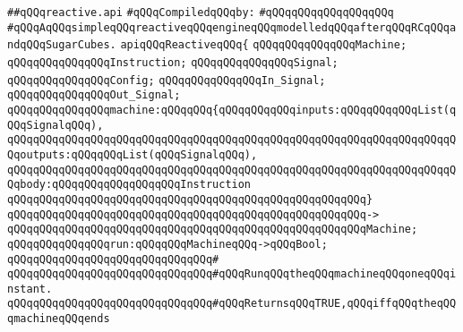 \label{src/lib/reactive/reactive.api}
\verb|##qQQqreactive.api|\newline
\newline
\verb|#qQQqCompiledqQQqby:|\newline
\verb|#qQQqqQQqqQQqqQQqqQQq|\newline
\newline
\newline
\newline
\verb|#qQQqAqQQqsimpleqQQqreactiveqQQqengineqQQqmodelledqQQqafterqQQqRCqQQqandqQQqSugarCubes.|\newline
\newline
\verb|apiqQQqReactiveqQQq{|\newline
\newline
\verb|qQQqqQQqqQQqqQQqMachine;|\newline
\verb|qQQqqQQqqQQqqQQqInstruction;|\newline
\verb|qQQqqQQqqQQqqQQqSignal;|\newline
\verb|qQQqqQQqqQQqqQQqConfig;|\newline
\verb|qQQqqQQqqQQqqQQqIn_Signal;|\newline
\verb|qQQqqQQqqQQqqQQqOut_Signal;|\newline
\newline
\verb|qQQqqQQqqQQqqQQqmachine:qQQqqQQq{qQQqqQQqqQQqinputs:qQQqqQQqqQQqList(qQQqSignalqQQq),|\newline
\verb|qQQqqQQqqQQqqQQqqQQqqQQqqQQqqQQqqQQqqQQqqQQqqQQqqQQqqQQqqQQqqQQqqQQqqQQqoutputs:qQQqqQQqList(qQQqSignalqQQq),|\newline
\verb|qQQqqQQqqQQqqQQqqQQqqQQqqQQqqQQqqQQqqQQqqQQqqQQqqQQqqQQqqQQqqQQqqQQqqQQqbody:qQQqqQQqqQQqqQQqqQQqInstruction|\newline
\verb|qQQqqQQqqQQqqQQqqQQqqQQqqQQqqQQqqQQqqQQqqQQqqQQqqQQqqQQq}|\newline
\verb|qQQqqQQqqQQqqQQqqQQqqQQqqQQqqQQqqQQqqQQqqQQqqQQqqQQqqQQq->|\newline
\verb|qQQqqQQqqQQqqQQqqQQqqQQqqQQqqQQqqQQqqQQqqQQqqQQqqQQqqQQqMachine;|\newline
\newline
\verb|qQQqqQQqqQQqqQQqrun:qQQqqQQqMachineqQQq->qQQqBool;|\newline
\verb|qQQqqQQqqQQqqQQqqQQqqQQqqQQqqQQq#|\newline
\verb|qQQqqQQqqQQqqQQqqQQqqQQqqQQqqQQq#qQQqRunqQQqtheqQQqmachineqQQqoneqQQqinstant.|\newline
\verb|qQQqqQQqqQQqqQQqqQQqqQQqqQQqqQQq#qQQqReturnsqQQqTRUE,qQQqiffqQQqtheqQQqmachineqQQqends|\newline
